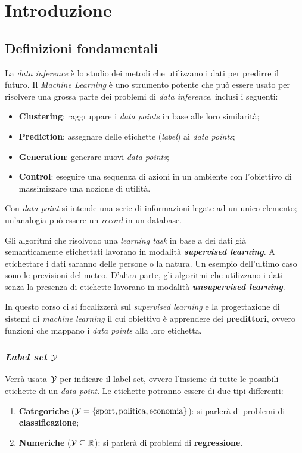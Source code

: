\section{Introduzione}

\subsection{Definizioni fondamentali}

La \textit{data inference} è lo studio dei metodi che utilizzano i dati per predirre il futuro. 
Il \textit{Machine Learning} è uno strumento potente che può essere usato per risolvere una 
grossa parte dei problemi di \textit{data inference}, inclusi i seguenti:
\begin{itemize}
    \item \textbf{Clustering}: raggruppare i \textit{data points} in base alle loro similarità;
    \item \textbf{Prediction}: assegnare delle etichette (\textit{label}) ai \textit{data points};
    \item \textbf{Generation}: generare nuovi \textit{data points};
    \item    \textbf{Control}: eseguire una sequenza di azioni in un ambiente con l'obiettivo di
                               massimizzare una nozione di utilità.
\end{itemize}

Con \textit{data point} si intende una serie di informazioni legate ad un unico elemento;
un'analogia può essere un \textit{record} in un database.

Gli algoritmi che risolvono una \textit{learning task} in base a dei dati già semanticamente
etichettati lavorano in modalità \textbf{\textit{supervised learning}}. A etichettare i dati
saranno delle persone o la natura. Un esempio dell'ultimo caso sono le previsioni del meteo. 
D'altra parte, gli algoritmi che utilizzano i dati senza la presenza di etichette lavorano in
modalità \textbf{\textit{unsupervised learning}}.

In questo corso ci si focalizzerà sul \textit{supervised learning} e la progettazione di 
sistemi di \textit{machine learning} il cui obiettivo è apprendere dei 
\textbf{predittori}, ovvero funzioni che mappano i \textit{data points} alla loro
etichetta.

\subsubsection{\textit{Label set} \texorpdfstring{$\mathcal{Y}$}{Y}}
Verrà usata $\mathcal{Y}$ per indicare il label set, ovvero l'insieme di tutte le possibili
etichette di un \textit{data point}. Le etichette potranno essere di due tipi differenti:
\begin{enumerate}
    \item \textbf{Categoriche} ($\mathcal{Y} = \{ \text{sport},\text{politica},\text{economia}\}$):
        si parlerà di problemi di \textbf{classificazione};
    \item \textbf{Numeriche} ($\mathcal{Y} \subseteq \mathbb{R} $): 
        si parlerà di problemi di \textbf{regressione}.
\end{enumerate}

